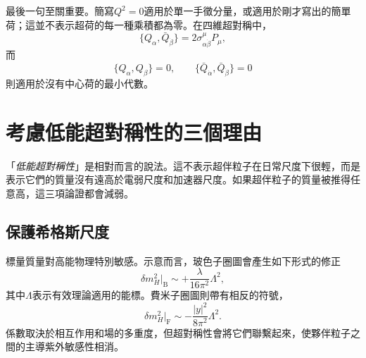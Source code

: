 \begin{classroomqa}
\end{classroomqa}

最後一句至關重要。簡寫\(Q^2=0\)適用於單一手徵分量，或適用於剛才寫出的簡單荷；這並不表示超荷的每一種乘積都為零。在四維超對稱中，
\begin{equation}
\{Q_\alpha,\bar Q_{\dot\beta}\}
=2\sigma^\mu_{\alpha\dot\beta}P_\mu,
\end{equation}
而
\begin{equation}
\{Q_\alpha,Q_\beta\}=0,
\qquad
\{\bar Q_{\dot\alpha},\bar Q_{\dot\beta}\}=0
\end{equation}
則適用於沒有中心荷的最小代數。

\section{考慮低能超對稱性的三個理由}

\begin{classroomqa}
\end{classroomqa}

「\emph{低能超對稱性}」是相對而言的說法。這不表示超伴粒子在日常尺度下很輕，而是表示它們的質量沒有遠高於電弱尺度和加速器尺度。如果超伴粒子的質量被推得任意高，這三項論證都會減弱。

\subsection{保護希格斯尺度}

標量質量對高能物理特別敏感。示意而言，玻色子圈圖會產生如下形式的修正
\begin{equation}
\delta m_H^2\big|_{\mathrm B}
\sim +\frac{\lambda}{16\pi^2}\Lambda^2,
\end{equation}
其中\(\Lambda\)表示有效理論適用的能標。費米子圈圖則帶有相反的符號，
\begin{equation}
\delta m_H^2\big|_{\mathrm F}
\sim -\frac{|y|^2}{8\pi^2}\Lambda^2.
\end{equation}
係數取決於相互作用和場的多重度，但超對稱性會將它們聯繫起來，使夥伴粒子之間的主導紫外敏感性相消。

